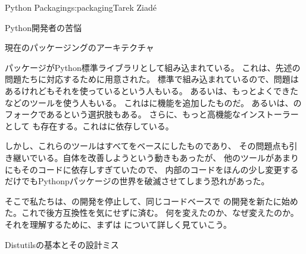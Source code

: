 \begin{aosachapter}{Python Packaging}{s:packaging}{Tarek Ziad\'{e}}
\begin{aosasect1}{Python開発者の苦悩}
\end{aosasect1}

\begin{aosasect1}{現在のパッケージングのアーキテクチャ}

パッケージがPython標準ライブラリとして組み込まれている。
これは、先述の問題たちに対応するために用意された。
標準で組み込まれているので、問題はあるけれどもそれを使っているという人もいる。
あるいは、もっとよくできたなどのツールを使う人もいる。
これはに機能を追加したものだ。
あるいは、のフォークであるという選択肢もある。
さらに、もっと高機能なインストーラーとして
も存在する。これはに依存している。

しかし、これらのツールはすべてをベースにしたものであり、
その問題点も引き継いでいる。自体を改善しようという動きもあったが、
他のツールがあまりにもそのコードに依存しすぎていたので、
内部のコードをほんの少し変更するだけでもPythonpパッケージの世界を破滅させてしまう恐れがあった。

そこで私たちは、の開発を停止して、同じコードベースで
の開発を新たに始めた。これで後方互換性を気にせずに済む。
何を変えたのか、なぜ変えたのか。それを理解するために、まずは
について詳しく見ていこう。

\begin{aosasect2}{Distutilsの基本とその設計ミス}
\label{sec.packaging.flaws}


\end{aosasect2}
\end{aosasect1}
\end{aosachapter}
